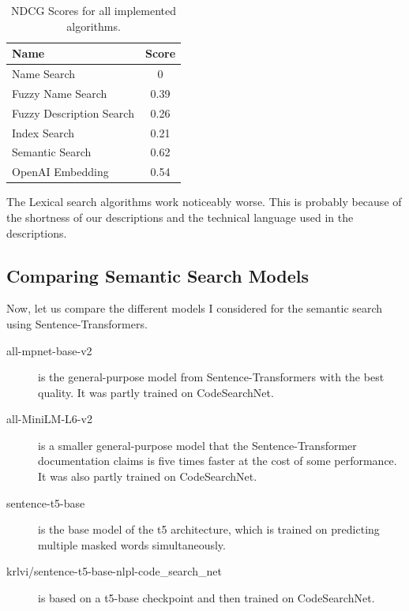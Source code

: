 \documentclass[
     12pt,                    %
     a4paper,             %
     BCOR=10mm,     %
     DIV=14,                 %
     listof=totoc,                    %
     bibliography=totoc,       %
     index=totoc,              %
     twoside,
     headsepline
     ]{scrreprt}
\begin{document}
\begin{table}[htb]
	\centering
	\begin{tabular}{l S}
		\toprule
		Name                     & {Score} \\ \midrule
		Name Search              & 0       \\
		Fuzzy Name Search        & 0.39    \\
		Fuzzy Description Search & 0.26    \\
		Index Search             & 0.21    \\
		Semantic Search          & 0.62    \\
		OpenAI Embedding         & 0.54    \\ \bottomrule
	\end{tabular}
	\caption[NDCG Scores]{\label{tab:ndcg}NDCG Scores for all implemented algorithms.}
\end{table}

The Lexical search algorithms work noticeably worse. This is probably because of the shortness of our descriptions and the technical language used in the descriptions.

\subsection{Comparing Semantic Search Models\label{semanticmodels}}

Now, let us compare the different models I considered for the semantic search using Sentence-Transformers.

\begin{description}
	\item[all-mpnet-base-v2] is the general-purpose model from Sentence-Transformers with the best quality. It was partly trained on CodeSearchNet.
	\item[all-MiniLM-L6-v2] is a smaller general-purpose model that the Sentence-Transformer documentation claims is five times faster at the cost of some performance. It was also partly trained on CodeSearchNet.
	\item[sentence-t5-base] is the base model of the t5 architecture, which is trained on predicting multiple masked words simultaneously. 
	\item[krlvi/sentence-t5-base-nlpl-code\_search\_net] is based on a t5-base checkpoint and then trained on CodeSearchNet.
\end{description}
\end{document}
